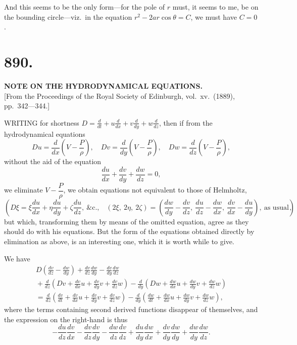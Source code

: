 \documentclass[11pt,a4paper]{article}
\begin{document}
And this seems to be the only form---for the pole of $r$ must, it seems to me, be on the bounding circle---viz.\ in the equation $r^2 - 2ar\cos\theta = C$, we must have $C=0$.


\section*{890.}
\begin{center}
{\large\bfseries NOTE ON THE HYDRODYNAMICAL EQUATIONS.}\\[0.5em]
\small [From the Proceedings of the Royal Society of Edinburgh, vol.\ xv.\ (1889), pp.\ 342---344.]
\end{center}

WRITING for shortness $\displaystyle D = \frac{d}{dt} + u\frac{d}{dx} + v\frac{d}{dy} + w\frac{d}{dz}$, then if from the hydrodynamical equations
\[
Du = \frac{d}{dx}\left(V - \frac{P}{\rho}\right),\quad Dv = \frac{d}{dy}\left(V - \frac{P}{\rho}\right),\quad Dw = \frac{d}{dz}\left(V - \frac{P}{\rho}\right),
\]
without the aid of the equation
\[
\frac{du}{dx} + \frac{dv}{dy} + \frac{dw}{dz} = 0,
\]
we eliminate $V - \dfrac{P}{\rho}$, we obtain equations not equivalent to those of Helmholtz,
\[
\left(D\xi = \xi\frac{du}{dx} + \eta\frac{du}{dy} + \zeta\frac{du}{dz},\ \text{\&c.,}\quad (2\xi,\ 2\eta,\ 2\zeta) = \left(\frac{dw}{dy} - \frac{dv}{dz},\ \frac{du}{dz} - \frac{dw}{dx},\ \frac{dv}{dx} - \frac{du}{dy}\right),\ \text{as usual}\right),
\]
but which, transforming them by means of the omitted equation, agree as they should do with his equations. But the form of the equations obtained directly by elimination as above, is an interesting one, which it is worth while to give.

We have
\begin{multline*}
D\left(\frac{dv}{dz} - \frac{dw}{dy}\right) + \frac{dv}{dz}\frac{dw}{dy} - \frac{dv}{dy}\frac{dw}{dz} \\
{} + \frac{d}{dz}\left(Dv + \frac{dv}{dx}u + \frac{dv}{dy}v + \frac{dv}{dz}w\right) - \frac{d}{dy}\left(Dw + \frac{dw}{dx}u + \frac{dw}{dy}v + \frac{dw}{dz}w\right) \\
{} = \frac{d}{dz}\left(\frac{dv}{dt} + \frac{dv}{dx}u + \frac{dv}{dy}v + \frac{dv}{dz}w\right) - \frac{d}{dy}\left(\frac{dw}{dt} + \frac{dw}{dx}u + \frac{dw}{dy}v + \frac{dw}{dz}w\right),
\end{multline*}
where the terms containing second derived functions disappear of themselves, and the expression on the right-hand is thus
\[
-\frac{du}{dz}\frac{dv}{dx} - \frac{dv}{dz}\frac{dv}{dy} - \frac{dw}{dz}\frac{dv}{dz} + \frac{du}{dy}\frac{dw}{dx} + \frac{dv}{dy}\frac{dw}{dy} + \frac{dw}{dy}\frac{dw}{dz}.
\]
\end{document}
